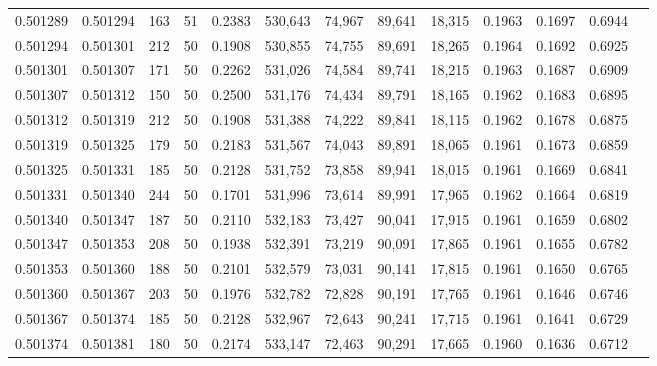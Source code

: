 \begin{tabular}{rrrrrrrrrrrrr}
0.501289 & 0.501294 & 163 &  51 &                                     0.2383 & 530,643 &  74,967 &  89,641 &  18,315 & 0.1963 & 0.1697 & 0.6944 \\
0.501294 & 0.501301 & 212 &  50 &                                     0.1908 & 530,855 &  74,755 &  89,691 &  18,265 & 0.1964 & 0.1692 & 0.6925 \\
0.501301 & 0.501307 & 171 &  50 &                                     0.2262 & 531,026 &  74,584 &  89,741 &  18,215 & 0.1963 & 0.1687 & 0.6909 \\
0.501307 & 0.501312 & 150 &  50 &                                     0.2500 & 531,176 &  74,434 &  89,791 &  18,165 & 0.1962 & 0.1683 & 0.6895 \\
0.501312 & 0.501319 & 212 &  50 &                                     0.1908 & 531,388 &  74,222 &  89,841 &  18,115 & 0.1962 & 0.1678 & 0.6875 \\
0.501319 & 0.501325 & 179 &  50 &                                     0.2183 & 531,567 &  74,043 &  89,891 &  18,065 & 0.1961 & 0.1673 & 0.6859 \\
0.501325 & 0.501331 & 185 &  50 &                                     0.2128 & 531,752 &  73,858 &  89,941 &  18,015 & 0.1961 & 0.1669 & 0.6841 \\
0.501331 & 0.501340 & 244 &  50 &                                     0.1701 & 531,996 &  73,614 &  89,991 &  17,965 & 0.1962 & 0.1664 & 0.6819 \\
0.501340 & 0.501347 & 187 &  50 &                                     0.2110 & 532,183 &  73,427 &  90,041 &  17,915 & 0.1961 & 0.1659 & 0.6802 \\
0.501347 & 0.501353 & 208 &  50 &                                     0.1938 & 532,391 &  73,219 &  90,091 &  17,865 & 0.1961 & 0.1655 & 0.6782 \\
0.501353 & 0.501360 & 188 &  50 &                                     0.2101 & 532,579 &  73,031 &  90,141 &  17,815 & 0.1961 & 0.1650 & 0.6765 \\
0.501360 & 0.501367 & 203 &  50 &                                     0.1976 & 532,782 &  72,828 &  90,191 &  17,765 & 0.1961 & 0.1646 & 0.6746 \\
0.501367 & 0.501374 & 185 &  50 &                                     0.2128 & 532,967 &  72,643 &  90,241 &  17,715 & 0.1961 & 0.1641 & 0.6729 \\
0.501374 & 0.501381 & 180 &  50 &                                     0.2174 & 533,147 &  72,463 &  90,291 &  17,665 & 0.1960 & 0.1636 & 0.6712 \\

\end{tabular}

